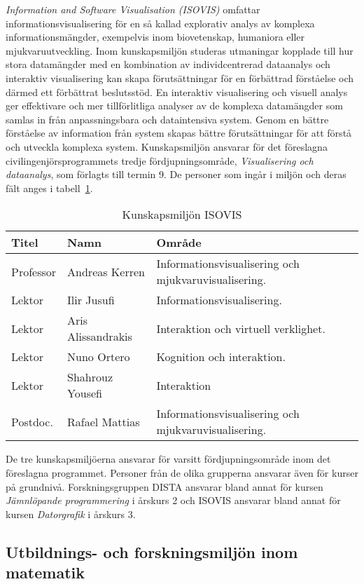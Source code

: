 \emph{Information and Software Visualisation (ISOVIS)} omfattar informationsvisualisering för en så kallad explorativ analys av komplexa informationsmängder, exempelvis inom biovetenskap, humaniora eller mjukvaruutveckling. Inom kunskapsmiljön studeras utmaningar kopplade till hur stora datamängder med en kombination av individcentrerad dataanalys och interaktiv visualisering kan skapa förutsättningar för en förbättrad förståelse och därmed ett förbättrat beslutsstöd. En interaktiv visualisering och visuell analys ger effektivare och mer tillförlitliga analyser av de komplexa datamängder som samlas in från anpassningsbara och dataintensiva system. Genom en bättre förståelse av information från system skapas bättre förutsättningar för att förstå och utveckla komplexa system. Kunskapsmiljön ansvarar för det föreslagna civilingenjörsprogrammets tredje fördjupningsområde, \emph{Visualisering och dataanalys}, som förlagts till termin 9. De personer som ingår i miljön och deras fält anges i tabell~\ref{tab:kmisovis}.

\begin{table}
\centering
\caption{Kunskapsmiljön ISOVIS\label{tab:kmisovis}}
\begin{tabular}{@{}llp{8cm}@{}}
\toprule
\textbf{\textsf{Titel}} & \textbf{\textsf{Namn}} & \textbf{\textsf{Område}}\tabularnewline
\midrule
Professor & Andreas Kerren & Informationsvisualisering och mjukvaruvisualisering.\tabularnewline
Lektor & Ilir Jusufi & Informationsvisualisering.\tabularnewline
Lektor & Aris Alissandrakis & Interaktion och virtuell verklighet.\tabularnewline
Lektor & Nuno Ortero & Kognition och interaktion.\tabularnewline
Lektor & Shahrouz Yousefi & Interaktion\tabularnewline
Postdoc. & Rafael Mattias & Informationsvisualisering och mjukvaruvisualisering.\tabularnewline
\bottomrule
\end{tabular}
\end{table}

De tre kunskapsmiljöerna ansvarar för varsitt fördjupningsområde inom det föreslagna programmet. Personer från de olika grupperna ansvarar även för kurser på grundnivå. Forskningsgruppen DISTA ansvarar bland annat för kursen \emph{Jämnlöpande programmering} i årskurs 2 och ISOVIS ansvarar bland annat för kursen \emph{Datorgrafik} i årskurs 3.

\subsection{Utbildnings- och forskningsmiljön inom matematik}

